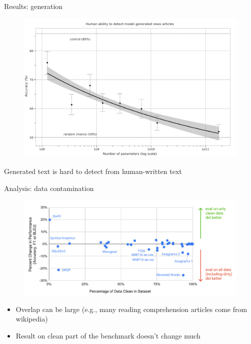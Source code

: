 \documentclass[usenames,dvipsnames,notes,11pt,aspectratio=169,hyperref={colorlinks=true, linkcolor=blue}]{beamer}
\begin{document}
\begin{frame}
    {Results: generation}
    \begin{figure}
        \includegraphics[height=0.6\textheight]{figures/gpt3-gen}
    \end{figure}
    Generated text is hard to detect from human-written text
\end{frame}

\begin{frame}
    {Analysis: data contamination}
    \begin{figure}
        \includegraphics[height=0.6\textheight]{figures/gpt3-contamination}
    \end{figure}
    \begin{itemize}
        \item Overlap can be large (e.g., many reading comprehension articles come from wikipedia) 
        \item Result on clean part of the benchmark doesn't change much
    \end{itemize}
\end{frame}
\end{document}

